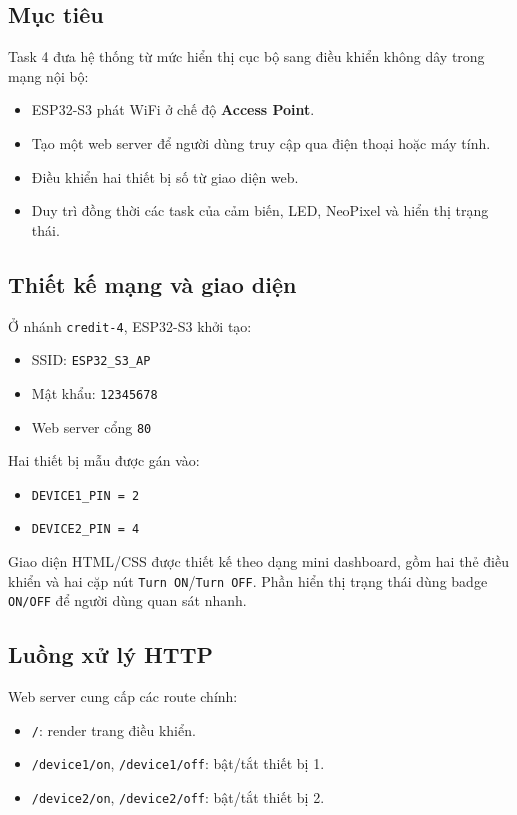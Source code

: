 \documentclass[12pt,a4paper]{article}
\begin{document}
\subsection{Mục tiêu}

Task 4 đưa hệ thống từ mức hiển thị cục bộ sang điều khiển không dây trong mạng nội bộ:
\begin{itemize}
  \item ESP32-S3 phát WiFi ở chế độ \textbf{Access Point}.
  \item Tạo một web server để người dùng truy cập qua điện thoại hoặc máy tính.
  \item Điều khiển hai thiết bị số từ giao diện web.
  \item Duy trì đồng thời các task của cảm biến, LED, NeoPixel và hiển thị trạng thái.
\end{itemize}

\subsection{Thiết kế mạng và giao diện}

Ở nhánh \texttt{credit-4}, ESP32-S3 khởi tạo:
\begin{itemize}
  \item SSID: \texttt{ESP32\_S3\_AP}
  \item Mật khẩu: \texttt{12345678}
  \item Web server cổng \texttt{80}
\end{itemize}

Hai thiết bị mẫu được gán vào:
\begin{itemize}
  \item \texttt{DEVICE1\_PIN = 2}
  \item \texttt{DEVICE2\_PIN = 4}
\end{itemize}

Giao diện HTML/CSS được thiết kế theo dạng mini dashboard, gồm hai thẻ điều khiển và hai cặp nút \texttt{Turn ON}/\texttt{Turn OFF}. Phần hiển thị trạng thái dùng badge \texttt{ON/OFF} để người dùng quan sát nhanh.

\subsection{Luồng xử lý HTTP}

Web server cung cấp các route chính:
\begin{itemize}
  \item \texttt{/}: render trang điều khiển.
  \item \texttt{/device1/on}, \texttt{/device1/off}: bật/tắt thiết bị 1.
  \item \texttt{/device2/on}, \texttt{/device2/off}: bật/tắt thiết bị 2.
\end{itemize}
\end{document}
